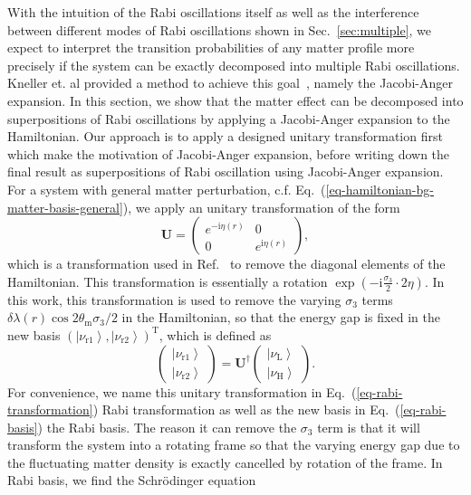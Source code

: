 \documentclass[%
reprint,
 amsmath,amssymb,
 prd,
]{revtex4-1}
\newcommand{\ket}[1]{\left| #1\right\rangle}
\newcommand{\ri}{\mathrm{i}}
\begin{document}
With the intuition of the Rabi oscillations itself as well as the interference between different modes of Rabi oscillations shown in Sec.~\ref{sec:multiple}, we expect to interpret the transition probabilities of any matter profile more precisely if the system can be exactly decomposed into multiple Rabi oscillations. Kneller et. al provided a method to achieve this goal~\cite{Kneller2013}, namely the Jacobi-Anger expansion. In this section, we show that the matter effect can be decomposed into superpositions of Rabi oscillations by applying a Jacobi-Anger expansion to the Hamiltonian. Our approach is to apply a designed unitary transformation first which make the motivation of Jacobi-Anger expansion, before writing down the final result as superpositions of Rabi oscillation using Jacobi-Anger expansion. For a system with general matter perturbation, c.f. Eq.~(\ref{eq-hamiltonian-bg-matter-basis-general}), we apply an unitary transformation of the form
\begin{equation}
    \mathbf{U} =  \begin{pmatrix} e^{-\ri \eta (r)} & 0 \\  0 & e^{\mathrm i \eta (r)}  \end{pmatrix},
    \label{eq-rabi-transformation}
\end{equation}
which is a transformation used in Ref.~ to remove the diagonal elements of the Hamiltonian. This transformation is essentially a rotation $\exp\left(-\mathrm i\frac{\sigma_3}{2}\cdot 2\eta\right)$. In this work, this transformation is used to remove the varying $\sigma_3$ terms $\delta\lambda(r) \cos 2\theta_{\mathrm m} \sigma_3/2$ in the Hamiltonian, so that the energy gap is fixed in the new basis $\left(\ket{\nu_{\mathrm{r1}}},\ket{\nu_{\mathrm{r2}}}\right)^{\mathrm{T}}$, which is defined as
\begin{equation}
    \begin{pmatrix} \ket{\nu_{\mathrm{r1}}}\\ \ket{\nu_{\mathrm{r2}}} \end{pmatrix} =  \mathbf{U}^\dagger \begin{pmatrix} \ket{\nu_{\mathrm{L}}} \\ \ket{\nu_{\mathrm{H}}} \end{pmatrix}.
    \label{eq-rabi-basis}
\end{equation}
For convenience, we name this unitary transformation in Eq.~(\ref{eq-rabi-transformation}) Rabi transformation as well as the new basis in Eq.~(\ref{eq-rabi-basis}) the Rabi basis. The reason it can remove the $\sigma_3$ term is that it will transform the system into a rotating frame so that the varying energy gap due to the fluctuating matter density is exactly cancelled by rotation of the frame. In Rabi basis, we find the Schr\"{o}dinger equation
\end{document}
